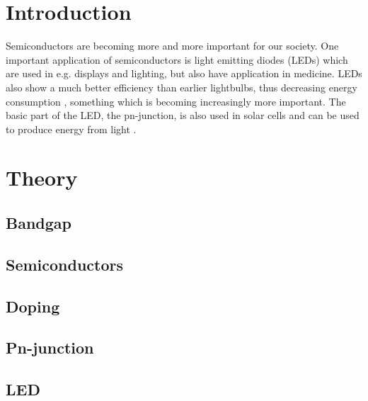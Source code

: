 \section{Introduction}
Semiconductors are becoming more and more important for our society. One important application of semiconductors is light emitting diodes (LEDs) \cite{hofmann2015} which are used in e.g. displays and lighting, but also have application in medicine. LEDs also show a much better efficiency than earlier lightbulbs, thus decreasing energy consumption \cite{hofmann2015}, something which is becoming increasingly more important. The basic part of the LED, the pn-junction, is also used in solar cells and can be used to produce energy from light \cite{hofmann2015}.

\section{Theory}
\subsection{Bandgap}

\subsection{Semiconductors}

\subsection{Doping}

\subsection{Pn-junction}

\subsection{LED}